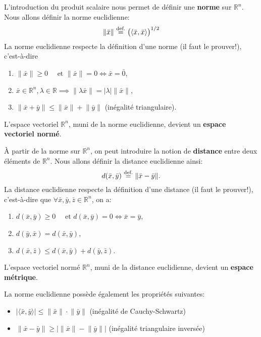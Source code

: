 \documentclass{report}
\newcommand*\eqdef{\; \stackrel{ \mathclap{ \normalfont\text{def.} } }{ = } \;} %
\newcommand*{\norm}[1]{\lVert#1\rVert}
\newcommand*{\abs}[1]{\lvert#1\rvert}
\begin{document}
\begin{defn}
	L'introduction du produit scalaire nous permet de définir une \textbf{norme} sur $\mathbb R^n$. Nous allons définir la norme euclidienne:
	\begin{equation}
		\norm{\bar x} \eqdef \bigl( \langle \bar x, \bar x \rangle \bigr)^{1/2}
	\end{equation}
	La norme euclidienne respecte la définition d'une norme (il faut le prouver!), c'est-à-dire
	\begin{enumerate}
		\item $\norm{\bar x} \geq 0 \quad \text{ et } \norm{\bar x} = 0 \iff \bar x = \bar 0$,
		\item $\bar x \in \mathbb R^n, \lambda \in \mathbb R \implies \norm{\lambda \bar x} = \abs{\lambda}\norm{\bar x}$,
		\item $\norm{\bar x + \bar y} \leq \norm{\bar x} + \norm{\bar y}$ (inégalité triangulaire).
	\end{enumerate}
	L'espace vectoriel $\mathbb R^n$, muni de la norme euclidienne, devient un \textbf{espace vectoriel normé}.
\end{defn}

\begin{defn}
	À partir de la norme sur $\mathbb R^n$, on peut introduire la notion de \textbf{distance} entre deux éléments de $\mathbb R^n$. Nous allons définir la distance euclidienne ainsi:
	\begin{equation}
		d(\bar x, \bar y) \eqdef \norm{\bar x - \bar y}.
	\end{equation}
	La distance euclidienne respecte la définition d'une distance (il faut le prouver!), c'est-à-dire que $\forall \bar x, \bar y, \bar z \in \mathbb R^n$, on a:
	\begin{enumerate}
		\item $d(\bar x, \bar y) \geq 0 \quad \text{ et } d(\bar x, \bar y) = 0 \iff \bar x = \bar y$,
		\item $d(\bar y, \bar x) = d(\bar x, \bar y)$,
		\item $d(\bar x, \bar z) \leq d(\bar x, \bar y) + d(\bar y, \bar z)$.
	\end{enumerate}
	L'espace vectoriel normé $\mathbb R^n$, muni de la distance euclidienne, devient un \textbf{espace métrique}.
\end{defn}

\begin{thm}
	La norme euclidienne possède également les propriétés suivantes:
	\begin{itemize}
		\item $\abs{\langle \bar x, \bar y \rangle} \leq \norm{\bar x} \cdot \norm{\bar y}$ \quad (inégalité de Cauchy-Schwartz)
		\item $\norm{\bar x - \bar y} \geq \abs{\norm{\bar x} - \norm{\bar y}}$ \quad (inégalité triangulaire inversée)
	\end{itemize}
\end{thm}
\end{document}
